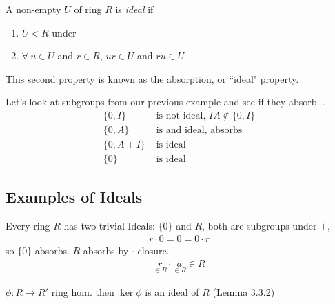\begin{definition}
    A non-empty $U$ of ring $R$ is \textit{ideal} if
    \begin{enumerate}[label=\roman*)]
        \item $U<R$ under $+$
        \item $\forall \ u \in U$ and $r \in R$, $ur\in U$ and $ru\in U$
    \end{enumerate}
    This second property is known as the absorption, or ``ideal" property.
\end{definition}
Let's look at subgroups from our previous example and see if they absorb...
\begin{align}
    \{0,I\}& \text{ is not ideal, }IA\not\in \{0,I\} \nonumber \\
    \{0,A\}& \text{ is and ideal, absorbs} \nonumber \\
    \{0,A+I\}& \text{ is  ideal } \nonumber \\
    \{0\}& \text{ is ideal} \nonumber
\end{align}

\subsection*{Examples of Ideals}
\begin{example}
    Every ring $R$ has two trivial Ideals: $\{0\}$ and $R$, both are subgroups under $+$,
    \begin{align}
        r\cdot 0 = 0 = 0\cdot r \nonumber
    \end{align}
    so $\{0\}$ absorbs. $R$ absorbs by $\cdot$ closure.
    \begin{align}
        \underset{\in R}{r}\cdot \underset{\in R}{a} \in R\nonumber
    \end{align}
\end{example}

\begin{example}
    $\phi : R \rightarrow R'$ ring hom. then $\ker \phi$ is an ideal of $R$ (Lemma 3.3.2)
\end{example}

